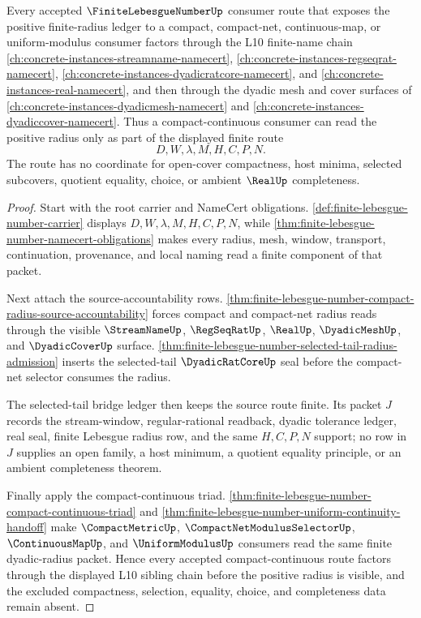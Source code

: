 \begin{theorem}
\label{thm:finite-lebesgue-number-l10-sibling-route}
Every accepted $\FiniteLebesgueNumberUp$ consumer route that exposes the positive finite-radius ledger to a compact, compact-net, continuous-map, or uniform-modulus consumer factors through the L10 finite-name chain
\autoref{ch:concrete-instances-streamname-namecert},
\autoref{ch:concrete-instances-regseqrat-namecert},
\autoref{ch:concrete-instances-dyadicratcore-namecert}, and
\autoref{ch:concrete-instances-real-namecert},
and then through the dyadic mesh and cover surfaces of
\autoref{ch:concrete-instances-dyadicmesh-namecert} and
\autoref{ch:concrete-instances-dyadiccover-namecert}. Thus a compact-continuous consumer can read the positive radius only as part of the displayed finite route
$$
D,W,\lambda,M,H,C,P,N .
$$
The route has no coordinate for open-cover compactness, host minima, selected subcovers, quotient equality, choice, or ambient $\RealUp$ completeness.
\end{theorem}
\begin{proof}
Start with the root carrier and NameCert obligations. \autoref{def:finite-lebesgue-number-carrier} displays $D,W,\lambda,M,H,C,P,N$, while \autoref{thm:finite-lebesgue-number-namecert-obligations} makes every radius, mesh, window, transport, continuation, provenance, and local naming read a finite component of that packet.

Next attach the source-accountability rows. \autoref{thm:finite-lebesgue-number-compact-radius-source-accountability} forces compact and compact-net radius reads through the visible $\StreamNameUp$, $\RegSeqRatUp$, $\RealUp$, $\DyadicMeshUp$, and $\DyadicCoverUp$ surface. \autoref{thm:finite-lebesgue-number-selected-tail-radius-admission} inserts the selected-tail $\DyadicRatCoreUp$ seal before the compact-net selector consumes the radius.

The selected-tail bridge ledger then keeps the source route finite. Its packet $J$ records the stream-window, regular-rational readback, dyadic tolerance ledger, real seal, finite Lebesgue radius row, and the same $H,C,P,N$ support; no row in $J$ supplies an open family, a host minimum, a quotient equality principle, or an ambient completeness theorem.

Finally apply the compact-continuous triad. \autoref{thm:finite-lebesgue-number-compact-continuous-triad} and \autoref{thm:finite-lebesgue-number-uniform-continuity-handoff} make $\CompactMetricUp$, $\CompactNetModulusSelectorUp$, $\ContinuousMapUp$, and $\UniformModulusUp$ consumers read the same finite dyadic-radius packet. Hence every accepted compact-continuous route factors through the displayed L10 sibling chain before the positive radius is visible, and the excluded compactness, selection, equality, choice, and completeness data remain absent.
\end{proof}
